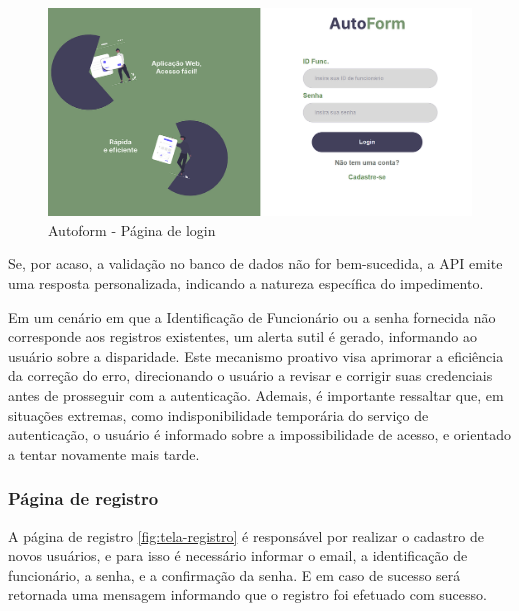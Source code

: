 \begin{figure}[htb]
    \caption{\label{fig:tela-login}Autoform - Página de login}
    \begin{center}
        \includegraphics[scale=0.5]{imagens/login-autoform.png}
    \end{center}
\end{figure}

 Se, por acaso, a validação no banco de dados não for bem-sucedida, a API emite uma resposta personalizada, indicando a natureza específica do impedimento.

Em um cenário em que a Identificação de Funcionário ou a senha fornecida não corresponde aos registros existentes, um alerta sutil é gerado, informando ao usuário sobre a disparidade. Este mecanismo proativo visa aprimorar a eficiência da correção do erro, direcionando o usuário a revisar e corrigir suas credenciais antes de prosseguir com a autenticação.
Ademais, é importante ressaltar que, em situações extremas, como indisponibilidade temporária do serviço de autenticação, o usuário é informado sobre a impossibilidade de acesso, e orientado a tentar novamente mais tarde.

\subsubsection{Página de registro}
A página de registro \autoref{fig:tela-registro} é responsável por realizar o cadastro de novos usuários, e para isso é necessário informar o email, a identificação de funcionário, a senha, e a confirmação da senha. E em caso de sucesso será retornada uma mensagem informando que o registro foi efetuado com sucesso.


